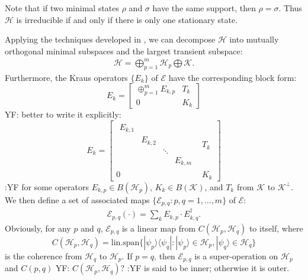 \documentclass[journal]{IEEEtran}
\def\h{\ensuremath{\mathcal{H}}}
\def\k{\ensuremath{\mathcal{K}}}
\def\e{\ensuremath{\mathcal{E}}}
\def\k{\mathcal{K}}
\newcommand{\authorComment}[3]{\color{#1}#2: {#3} :#2\color{black}}
\newcommand{\yf}[1]{\authorComment{blue}{YF}{#1}}
\begin{document}
Note that if two minimal states $\rho$ and $\sigma$ have the same support, then $\rho=\sigma$. Thus $\h$ is irreducible if and only if there is only one stationary state.


Applying the techniques developed in \cite{ying2013reachability,baumgartner2012structure}, we can decompose $\h$ into mutually orthogonal minimal subspaces and the largest transient subspace: 
\begin{eqnarray}\label{eq_mini_dec}
  \h=\bigoplus_{p=1}^m\h_p\bigoplus\k.
\end{eqnarray}
Furthermore, the Kraus operators $\{E_k\}$ of $\e$ have the  corresponding block form:
$$E_k=\left[\begin{matrix}
  \oplus_{p=1}^m E_{k,p} & T_k\\
0&K_k
\end{matrix}\right]$$
\yf{better to write it explicitly:
$$\renewcommand{\arraystretch}{1.2}
E_k=\left[\begin{array}{c|c}
  \begin{array}{cccc}
  E_{k,1} & & &\\
  & E_{k,2}  & &\\
  & & \ddots &\\
  & & & E_{k,m}  
  \end{array} & T_k\\
  \hline
0&K_k
\end{array}\right]$$
 }
 for some operators $E_{k,p}\in B(\h_p)$, $K_k\in B(\k)$, and $T_k$ from $\k$ to $\k^\perp$. 
We then define a set of associated maps $\{\e_{p,q} : p,q = 1, \dots, m\}$ of $\e$:
\begin{eqnarray}\label{Eq_ass_maps}
  \e_{p,q}(\cdot)=\sum_{k} E_{k,p}\cdot E_{k,q}^\dagger.
\end{eqnarray}
Obviously, for any $p$ and $q$, $\e_{p,q}$ is a linear  map from $C(\h_p,\h_q)$ to itself, where 
\[
	C(\h_p,\h_q)=\textrm{lin.span}\{|\psi_{p}\rangle\langle\psi_q | : |\psi_{p}\rangle\in \h_{p}, |\psi_{q}\rangle\in \h_{q}\}
\]
is the coherence from $\h_q$ to $\h_p$. If $p=q$, then $\e_{p,q}$ is a super-operation on $\h_p$ and $C(p,q)$ \yf{$C(\h_p,\h_q)$?} is said to be inner; otherwise it is outer. 
\end{document}

